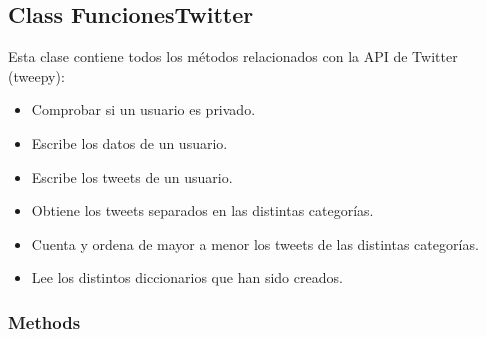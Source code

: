 
\subsection{Class FuncionesTwitter}

    \label{funcionesTwitter:FuncionesTwitter}
Esta clase contiene todos los métodos relacionados con la API de Twitter 
(tweepy):

\begin{itemize}
\setlength{\parskip}{0.6ex}
  \item Comprobar si un usuario es privado.

  \item Escribe los datos de un usuario.

  \item Escribe los tweets de un usuario.

  \item Obtiene los tweets separados en las distintas categorías.

  \item Cuenta y ordena de mayor a menor los tweets de las distintas 
    categorías.

  \item Lee los distintos diccionarios que han sido creados.

\end{itemize}



  \subsubsection{Methods}

    \label{funcionesTwitter:FuncionesTwitter:esPrivado}

    \vspace{0.5ex}

